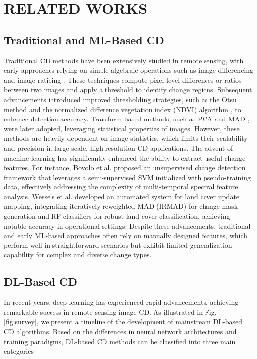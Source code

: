 \section{RELATED WORKS}
\label{B}
\subsection{Traditional and ML-Based CD}  

Traditional CD methods have been extensively studied in remote sensing, with early approaches relying on simple algebraic operations such as image differencing \cite{imagediff} and image ratioing \cite{imageratio}. 
These techniques compute pixel-level differences or ratios between two images and apply a threshold to identify change regions. 
Subsequent advancements introduced improved thresholding strategies, such as the Otsu method \cite{ostu} and the normalized difference vegetation index (NDVI) algorithm \cite{ndvi}, to enhance detection accuracy. 
Transform-based methods, such as PCA \cite{pca} and MAD \cite{mad}, were later adopted, leveraging statistical properties of images. 
However, these methods are heavily dependent on image statistics, which limits their scalability and precision in large-scale, high-resolution CD applications.  
The advent of machine learning has significantly enhanced the ability to extract useful change features. 
For instance, Bovolo et al. \cite{svm2} proposed an unsupervised change detection framework that leverages a semi-supervised SVM initialized with pseudo-training data, effectively addressing the complexity of multi-temporal spectral feature analysis. 
Wessels et al. \cite{randomforest} developed an automated system for land cover update mapping, integrating iteratively reweighted MAD (IRMAD) for change mask generation and RF classifiers for robust land cover classification, achieving notable accuracy in operational settings.  
Despite these advancements, traditional and early ML-based approaches often rely on manually designed features, which perform well in straightforward scenarios but exhibit limited generalization capability for complex and diverse change types. 

\subsection{DL-Based CD}
In recent years, deep learning has experienced rapid advancements, achieving remarkable success in remote sensing image CD. 
As illustrated in Fig. \ref{fig:survey}, we present a timeline of the development of mainstream DL-based CD algorithms. 
Based on the differences in neural network architectures and training paradigms, DL-based CD methods can be classified into three main categories

